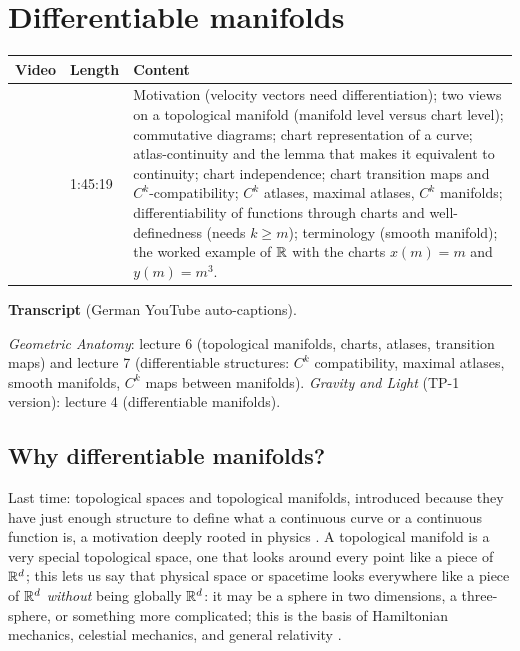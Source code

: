 \chapter{Differentiable manifolds}\label{ch:c03}
\begin{paracol}{2}

\begin{sources}
\begin{tabularx}{\linewidth}{@{}l l L@{}}
\toprule
\textbf{Video} & \textbf{Length} & \textbf{Content}\\
\midrule
{} & 1:45:19 & Motivation (velocity vectors need
differentiation); two views on a topological manifold (manifold level versus chart level); commutative diagrams;
chart representation of a curve; atlas-continuity and the lemma that makes it equivalent to continuity; chart independence;
chart transition maps and $C^k$-compatibility; $C^k$ atlases, maximal atlases, $C^k$ manifolds; differentiability of
functions through charts and well-definedness (needs $k\ge m$); terminology (smooth manifold); the worked example of $\mathbb{R}$ with
the charts $x(m)=m$ and $y(m)=m^3$.\\
\bottomrule
\end{tabularx}

\smallskip
\textbf{Transcript}  (German YouTube auto-captions).
\end{sources}

\begin{reading}
\emph{Geometric Anatomy}: lecture 6 (topological manifolds, charts, atlases, transition maps) and lecture 7
(differentiable structures: $C^k$ compatibility, maximal atlases, smooth manifolds, $C^k$ maps between manifolds).
\emph{Gravity and Light} (TP-1 version): lecture 4 (differentiable manifolds).
\end{reading}

\section{Why differentiable manifolds?}\label{sec:dm-motivation}

Last time: topological spaces and topological manifolds, introduced because they have just enough structure to define
what a continuous curve or a continuous function is, a motivation deeply rooted in physics .
A topological manifold is a very special topological space, one that looks around every point like a piece of $\mathbb{R}^d$;
this lets us say that physical space or spacetime looks everywhere like a piece of $\mathbb{R}^d$ \emph{without} being
globally $\mathbb{R}^d$: it may be a sphere in two dimensions, a three-sphere, or something more complicated; this is the basis of
Hamiltonian mechanics, celestial mechanics, and general relativity .


\end{paracol}
